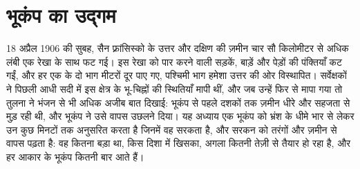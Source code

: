 \chapter{भूकंप का उद्गम}\label{ch:b1:earthquake-source}

18 अप्रैल 1906 की सुबह, सैन फ़्रांसिस्को के उत्तर और दक्षिण की ज़मीन चार सौ किलोमीटर से अधिक लंबी एक रेखा के साथ फट गई। इस रेखा को पार करने वाली सड़कें, बाड़ें और पेड़ों की पंक्तियाँ कट गईं, और हर एक के दो भाग मीटरों दूर पाए गए, पश्चिमी भाग हमेशा उत्तर की ओर विस्थापित। सर्वेक्षकों ने पिछली आधी सदी में इस क्षेत्र के भू-चिह्नों की स्थितियाँ मापी थीं, और जब उन्हें फिर से मापा गया तो तुलना ने भंजन से भी अधिक अजीब बात दिखाई: भूकंप से पहले दशकों तक ज़मीन धीरे और सहजता से मुड़ रही थी, और भूकंप ने उसे वापस उछलने दिया। यह अध्याय एक भूकंप को भ्रंश के धीमे भार से लेकर उन कुछ मिनटों तक अनुसरित करता है जिनमें वह सरकता है, और सरकन को तरंगों और ज़मीन से वापस पढ़ता है: वह कितना बड़ा था, किस दिशा में खिसका, अगला कितनी तेज़ी से तैयार हो रहा है, और हर आकार के भूकंप कितनी बार आते हैं।

